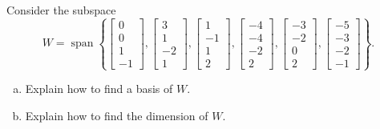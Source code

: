 
\begin{exerciseStatement}


Consider the subspace \[W=\operatorname{span}  \left\{ \left[\begin{array}{c}
0 \\
0 \\
1 \\
-1
\end{array}\right] , \left[\begin{array}{c}
3 \\
1 \\
-2 \\
1
\end{array}\right] , \left[\begin{array}{c}
1 \\
-1 \\
1 \\
2
\end{array}\right] , \left[\begin{array}{c}
-4 \\
-4 \\
-2 \\
2
\end{array}\right] , \left[\begin{array}{c}
-3 \\
-2 \\
0 \\
2
\end{array}\right] , \left[\begin{array}{c}
-5 \\
-3 \\
-2 \\
-1
\end{array}\right] \right\} .\]


\begin{enumerate}[(a)]
\item  Explain how to find a basis of \(W\).
\item  Explain how to find the dimension of \(W\).
\end{enumerate}
    
\end{exerciseStatement}
    
